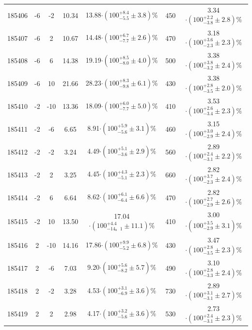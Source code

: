 \begin{table}[ht!]
{\begin{tabular}{c|c|c|c|c|c|c}
185406 & -6    &  -2  &  10.34   &    13.88$\cdot (100^{+8.4}_{-5.5}\pm 3.8 )$\%   &    450       &           3.34$\cdot (100^{+2.2}_{-3.8}\pm 2.8)$\% \\
185407 & -6    &  2   &  10.67   &    14.48$\cdot (100^{+6.7}_{-7.7}\pm 2.6 )$\%   &    470       &           3.18$\cdot (100^{+3.6}_{-2.3}\pm 2.3 )$\% \\
185408 & -6    &  6   &  14.38   &    19.19$\cdot (100^{+8.5}_{-8.0}\pm  4.0 )$\%   &    500       &           3.38$\cdot (100^{+3.8}_{-3.2}\pm 2.4)$\%\\
185409 & -6    &  10  &  21.66   &    28.23$\cdot (100^{+8.3}_{-9.8}\pm 6.1 )$\%   &    430       &           3.38$\cdot (100^{+2.8}_{-3.5}\pm 2.0 )$\%\\
\hline
185410 & -2    &  -10 &  13.36   &    18.09$\cdot (100^{+6.0}_{-7.7}\pm  5.0 )$\%   &    410       &           3.53$\cdot (100^{+2.6}_{-3.4}\pm 2.3)$\%\\
185411 & -2    &  -6  &  6.65    &    8.91$\cdot (100^{+5.9}_{-5.6}\pm 3.1  )$\%    &    460       &           3.15$\cdot (100^{+3.0}_{-2.9}\pm 2.4)$\%\\
185412 & -2    &  -2  &  3.24    &    4.49$\cdot (100^{+5.1}_{-3.6}\pm 2.9 )$\%    &    560       &           2.89$\cdot (100^{+2.4}_{-3.1}\pm 2.2)$\%\\
185413 & -2    &  2   &  3.25    &    4.45$\cdot (100^{+4.3}_{-5.1}\pm 2.3 )$\%    &    660       &           2.82$\cdot (100^{+3.7}_{-2.3}\pm 2.4 )$\%\\
185414 & -2    &  6   &  6.64    &    8.62$\cdot (100^{+6.1}_{-6.4}\pm 6.6 )$\%    &    470       &           2.82$\cdot (100^{+2.7}_{-2.9}\pm 2.6)$\%\\
185415 & -2    &  10  &  13.50    &    17.04$\cdot (100^{+4.4}_{-14。1}\pm 11.1 )$\%   &   410       &           3.00$\cdot (100^{+3.5}_{-2.9}\pm 3.1)$\%\\
\hline
185416 & 2     &  -10 &  14.16   &    17.86$\cdot (100^{+9.9}_{-5.2}\pm 6.8 )$\%   &    430       &           3.47$\cdot (100^{+2.8}_{-3.5}\pm 2.3 )$\%\\ 
185417 & 2     &  -6  &  7.03    &    9.20$\cdot (100^{+5.6}_{-8.2}\pm 5.7 )$\%     &   490       &           3.10$\cdot (100^{+2.8}_{-3.3}\pm 2.4)$\%\\
185418 & 2     &  -2  &  3.28    &    4.53$\cdot (100^{+3.1}_{-6.9}\pm 3.6 )$\%    &    730       &           2.89$\cdot (100^{+3.1}_{-3.1}\pm 2.7 )$\%\\
185419 & 2     &  2   &  2.98    &    4.17$\cdot (100^{+3.2}_{-5.6}\pm 3.6 )$\%    &    530       &           2.73$\cdot (100^{+2.4}_{-3.1}\pm 2.3 )$\%\\

\end{tabular}}
\end{table}

